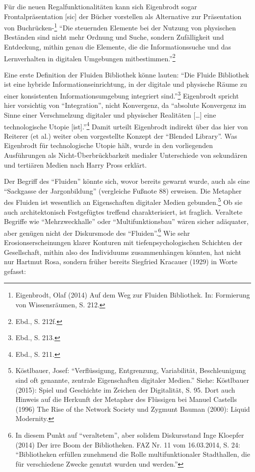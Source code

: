 \documentclass[a4paper,
fontsize=11pt,
oneside,
numbers=noperiodatend,
parskip=half-,
bibliography=totoc,
final
]{scrartcl}
\begin{document}
Für die neuen Regalfunktionalitäten kann sich Eigenbrodt sogar
Frontalpräsentation {[}sic{]} der Bücher vorstellen als Alternative zur
Präsentation von Buchrücken-\footnote{Eigenbrodt, Olaf (2014) Auf dem
  Weg zur Fluiden Bibliothek. In: Formierung von Wissensräumen, S. 212.}
\enquote{Die steuernden Elemente bei der Nutzung von physischen
Beständen sind nicht mehr Ordnung und Suche, sondern Zufälligkeit und
Entdeckung, mithin genau die Elemente, die die Informationssuche und das
Lernverhalten in digitalen Umgebungen mitbestimmen.}\footnote{Ebd., S.
  212f.}

Eine erste Definition der Fluiden Bibliothek könne lauten: \enquote{Die
Fluide Bibliothek ist eine hybride Informationseinrichtung, in der
digitale und physische Räume zu einer konsistenten Informationsumgebung
integriert sind.}\footnote{Ebd., S. 213.} Eigenbrodt spricht hier
vorsichtig von \enquote{Integration}, nicht Konvergenz, da
\enquote{absolute Konvergenz im Sinne einer Verschmelzung digitaler und
physischer Realitäten {[}\ldots{}{]} eine technologische Utopie
{[}ist{]}.}\footnote{Ebd., S. 211.} Damit urteilt Eigenbrodt indirekt
über das hier von Reiterer (et al.) weiter oben vorgestellte Konzept der
\enquote{Blended Library}. Was Eigenbrodt für technologische Utopie
hält, wurde in den vorliegenden Ausführungen als Nicht-Überbrückbarkeit
medialer Unterschiede von sekundären und tertiären Medien nach Harry
Pross erklärt.

Der Begriff des \enquote{Fluiden} könnte sich, wovor bereits gewarnt
wurde, auch als eine \enquote{Sackgasse der Jargonbildung} (vergleiche
Fußnote 88) erweisen. Die Metapher des Fluiden ist wesentlich an
Eigenschaften digitaler Medien gebunden.\footnote{Köstlbauer, Josef:
  \enquote{Verflüssigung, Entgrenzung, Variabilität, Beschleunigung sind
  oft genannte, zentrale Eigenschaften digitaler Medien.} Siehe:
  Köstlbauer (2015): Spiel und Geschichte im Zeichen der Digitalität, S.
  95. Dort auch Hinweis auf die Herkunft der Metapher des Flüssigen bei
  Manuel Castells (1996) The Rise of the Network Society und Zygmunt
  Bauman (2000): Liquid Modernity.} Ob sie auch architektonisch
Festgefügtes treffend charakterisiert, ist fraglich. Veraltete Begriffe
wie \enquote{Mehrzweckhalle} oder \enquote{Multifunktionsbau} wären
sicher adäquater, aber genügen nicht der Diskursmode des
\enquote{Fluiden}.\footnote{In diesem Punkt auf \enquote{veraltetem},
  aber solidem Diskursstand Inge Kloepfer (2014) Der irre Boom der
  Bibliotheken. FAZ Nr. 11 vom 16.03.2014, S. 24: \enquote{Bibliotheken
  erfüllen zunehmend die Rolle multifunktionaler Stadthallen, die für
  verschiedene Zwecke genutzt wurden und werden.}} Wie sehr
Erosionserscheinungen klarer Konturen mit tiefenpsychologischen
Schichten der Gesellschaft, mithin also des Individuums zusammenhängen
könnten, hat nicht nur Hartmut Rosa, sondern früher bereits Siegfried
Kracauer (1929) in Worte gefasst:
\end{document}
